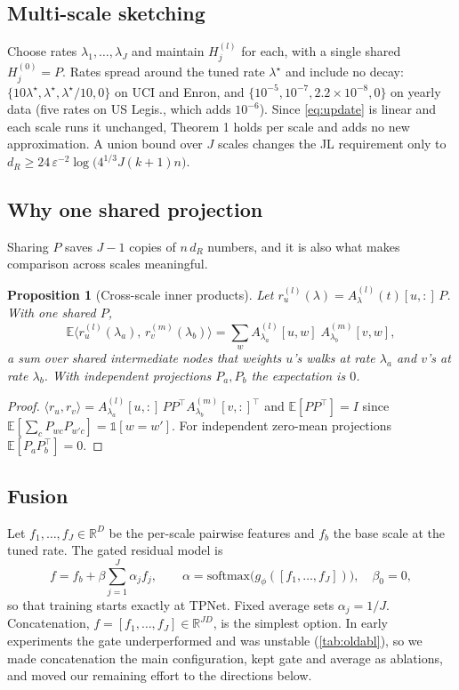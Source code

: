 \documentclass[11pt,a4paper]{article}
\newtheorem{proposition}{Proposition}
\theoremstyle{remark}
\newcommand{\R}{\mathbb{R}}
\newcommand{\E}{\mathbb{E}}
\begin{document}
\subsection{Multi-scale sketching}
Choose rates $\lambda_1,\dots,\lambda_J$ and maintain $H_j^{(l)}$ for each, with a single shared $H_j^{(0)}=P$. Rates spread around the tuned rate $\lambda^\star$ and include no decay: $\{10\lambda^\star,\lambda^\star,\lambda^\star/10,0\}$ on UCI and Enron, and $\{10^{-5},10^{-7},2.2\times10^{-8},0\}$ on yearly data (five rates on US Legis., which adds $10^{-6}$). Since \eqref{eq:update} is linear and each scale runs it unchanged, Theorem 1 holds per scale and adds no new approximation. A union bound over $J$ scales changes the JL requirement only to $d_R\ge 24\,\varepsilon^{-2}\log\bigl(4^{1/3}J(k+1)n\bigr)$.

\subsection{Why one shared projection}
Sharing $P$ saves $J-1$ copies of $n\,d_R$ numbers, and it is also what makes comparison across scales meaningful.
\begin{proposition}[Cross-scale inner products]\label{prop:cross}
Let $r_u^{(l)}(\lambda)=A_{\lambda}^{(l)}(t)[u,:]\,P$. With one shared $P$,
\begin{equation}
\E\bigl\langle r_u^{(l)}(\lambda_a),\,r_v^{(m)}(\lambda_b)\bigr\rangle = \sum_{w} A^{(l)}_{\lambda_a}[u,w]\;A^{(m)}_{\lambda_b}[v,w],
\end{equation}
a sum over shared intermediate nodes that weights $u$'s walks at rate $\lambda_a$ and $v$'s at rate $\lambda_b$. With independent projections $P_a,P_b$ the expectation is $0$.
\end{proposition}
\begin{proof}
$\langle r_u,r_v\rangle=A_{\lambda_a}^{(l)}[u,:]\,PP^{\top}A_{\lambda_b}^{(m)}[v,:]^{\top}$ and $\E[PP^{\top}]=I$ since $\E[\sum_c P_{wc}P_{w'c}]=\mathbb{1}[w=w']$. For independent zero-mean projections $\E[P_aP_b^{\top}]=0$.
\end{proof}

\subsection{Fusion}
Let $f_1,\dots,f_J\in\R^D$ be the per-scale pairwise features and $f_b$ the base scale at the tuned rate. The gated residual model is
\begin{equation}\label{eq:gate}
f=f_b+\beta\sum_{j=1}^{J}\alpha_j f_j,\qquad \alpha=\mathrm{softmax}\bigl(g_\phi([f_1,\dots,f_J])\bigr),\quad \beta_0=0,
\end{equation}
so that training starts exactly at TPNet. Fixed average sets $\alpha_j=1/J$. Concatenation, $f=[f_1,\dots,f_J]\in\R^{JD}$, is the simplest option. In early experiments the gate underperformed and was unstable (\cref{tab:oldabl}), so we made concatenation the main configuration, kept gate and average as ablations, and moved our remaining effort to the directions below.
\end{document}
